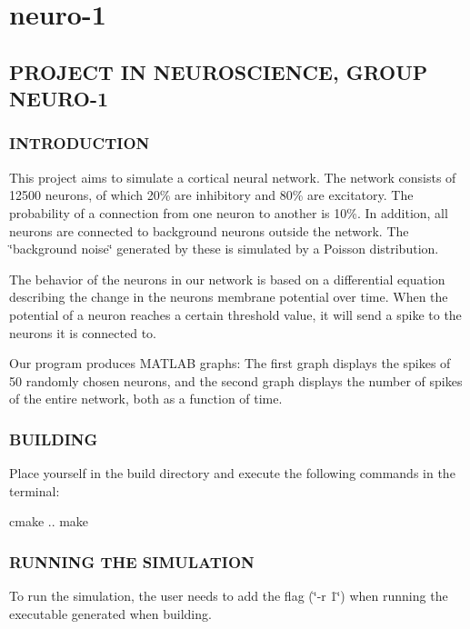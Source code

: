 \section*{neuro-\/1}

\subsection*{P\+R\+O\+J\+E\+CT IN N\+E\+U\+R\+O\+S\+C\+I\+E\+N\+CE, G\+R\+O\+UP N\+E\+U\+R\+O-\/1}

\subsubsection*{I\+N\+T\+R\+O\+D\+U\+C\+T\+I\+ON}

This project aims to simulate a cortical neural network. The network consists of 12500 neurons, of which 20\% are inhibitory and 80\% are excitatory. The probability of a connection from one neuron to another is 10\%. In addition, all neurons are connected to background neurons outside the network. The \char`\"{}background noise\char`\"{} generated by these is simulated by a Poisson distribution.

The behavior of the neurons in our network is based on a differential equation describing the change in the neuron\textquotesingle{}s membrane potential over time. When the potential of a neuron reaches a certain threshold value, it will send a spike to the neurons it is connected to.

Our program produces M\+A\+T\+L\+AB graphs\+: The first graph displays the spikes of 50 randomly chosen neurons, and the second graph displays the number of spikes of the entire network, both as a function of time.

\subsubsection*{B\+U\+I\+L\+D\+I\+NG}

Place yourself in the build directory and execute the following commands in the terminal\+: \begin{DoxyVerb}    cmake ..
    make
\end{DoxyVerb}


\subsubsection*{R\+U\+N\+N\+I\+NG T\+HE S\+I\+M\+U\+L\+A\+T\+I\+ON}

To run the simulation, the user needs to add the flag (\char`\"{}-\/r 1\char`\"{}) when running the executable generated when building.

